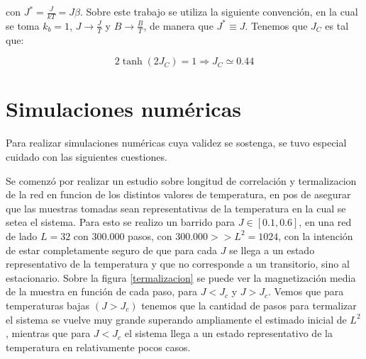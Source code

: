 \documentclass[
 reprint,
 amsmath,amssymb,
 aps,
]{revtex4-1}
\begin{document}
con $J^* = \frac{J}{kT} = J\beta$. Sobre este trabajo se utiliza la siguiente
convenci\'on, en la cual se toma $k_b = 1$, $J \rightarrow \frac{J}{T}$ y $B
\rightarrow \frac{B}{T}$, de manera que $J^* \equiv J$. Tenemos que $J_C$ es tal
que:

\begin{equation}
  2 \tanh(2 J_C) = 1 \Rightarrow J_C \simeq 0.44
\end{equation}

\section{\label{simulations}Simulaciones num\'ericas}

Para realizar simulaciones num\'ericas cuya validez se sostenga, se tuvo
especial cuidado con las siguientes cuestiones.

Se comenz\'o por realizar un estudio sobre longitud de correlaci\'on y
termalizacion de la red en funcion de los distintos valores de temperatura, en
pos de asegurar que las muestras tomadas sean representativas de la temperatura
en la cual se setea el sistema. Para esto se realizo un barrido para $J \in
[0.1, 0.6]$, en una red de lado $L = 32$ con $300.000$ pasos,
con $300.000 >> L^2 = 1024$, con la intenci\'on de estar completamente seguro
de que para cada $J$ se llega a un estado representativo de la temperatura y
que no corresponde a un transitorio, sino al estacionario. Sobre la figura
\ref{termalizacion} se puede ver la magnetizaci\'on media de la muestra en
funci\'on de cada paso, para $J < J_c$ y $J > J_c$. Vemos que para temperaturas
bajas $(J > J_c)$ tenemos que la cantidad de pasos para termalizar el sistema
se vuelve muy grande superando ampliamente el estimado inicial de $L^2$,
mientras que para $J < J_c$ el sistema llega a un estado representativo de la
temperatura en relativamente pocos casos.
\end{document}

